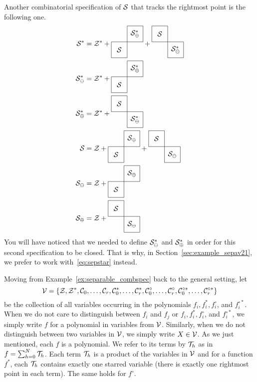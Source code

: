 \documentclass[12pt, a4paper, twoside]{report}
\begin{document}
\begin{example}
Another combinatorial specification of $\S$ that tracks the rightmost point is the following one.
  \begin{align*}
    \S^* &= \Z^* + \cplusc{\S}{\S_\oplus^*} + \cminusc{\S_\ominus^*}{\S}\\
    \S_\ominus^* &= \Z^* + \cplusc{\S}{\S_\oplus^*}\\
    \S_\oplus^* &= \Z^* + \cminusc{\S_\ominus^*}{\S}\\
    \S &= \Z + \cplusc{\S}{\S_\oplus} + \cminusc{\S_\ominus}{\S}\\
    \S_\ominus &= \Z + \cplusc{\S}{\S_\oplus}\\
    \S_\oplus &= \Z + \cminusc{\S_\ominus}{\S}
  \end{align*}
  You will have noticed that we needed to define $\S_\ominus^*$ and $\S_\oplus^*$ in order for this second specification to be closed. That is why, in Section~\ref{sec:example_sepav21}, we prefer to work with~\eqref{eq:sepstar} instead.
\end{example}


Moving from Example~\ref{ex:separable_combspec} back to the general setting, let
$$\V = \{\Z,\Z^*,\C_0,\ldots,\C_r,\C^*_0,\ldots,\C_r^*, \C^\circ_0,\ldots,\C_r^\circ, \C^{\circ*}_0,\ldots,\C_r^{\circ*}\}$$
be the collection of all variables occurring in the polynomials $f_i,f_i^*,f_i^\circ$, and $f_i^{\circ*}$. When we do not care to distinguish between $f_i$ and $f_j$ or $f_i, f_i^*, f_i^\circ$, and $f_i^{\circ*}$, we simply write $f$ for a polynomial in variables from $\V$. Similarly, when we do not distinguish between two variables in $\V$, we simply write $X \in \V$. As we just mentioned, each $f$ is a polynomial. We refer to its terms by $\T_h$ as in $f = \sum_{h=0}^N\T_h$. Each term $\T_h$ is a product of the variables in $\V$ and for a function $f^*$, each $\T_h$ contains exactly one starred variable (there is exactly one rightmost point in each term). The same holds for $f^\circ$. 
\end{document}
